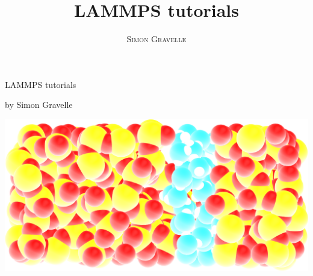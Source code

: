 \documentclass[a4paper,11pt]{book}
\title{\Huge \textbf{LAMMPS tutorials}}
\author{\textsc{Simon Gravelle}}
\date{}
\begin{document}
\begin{titlepage}
\pagecolor{titlepagecolor}
\noindent
\color{white}
\begin{center}
\vspace{1.5cm}
\hspace{0.7cm}\textsf{{\fontsize{50}{60}\selectfont LAMMPS tutorials}}
\par
\vspace{0.5cm}
{\textsf{\fontsize{20}{60}\selectfont by Simon Gravelle}}
\end{center}

\vspace{4cm}
\begin{center}
\noindent \includegraphics[width=16cm]{logo/logo-large-dark.png}
\end{center}
\end{titlepage}
\restoregeometry %
\nopagecolor%

\tableofcontents
\mainmatter








\end{document}
